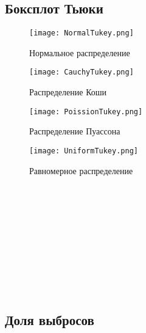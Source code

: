 \documentclass{article}
\begin{document}
\subsection{Боксплот Тьюки}

\begin{figure}[!ht]
\begin{center}
\texttt{[image: NormalTukey.png]}
\caption{Нормальное распределение}\label{figure1}
\end{center}
\end{figure}

\begin{figure}[!ht]
\begin{center}
\texttt{[image: CauchyTukey.png]}
\caption{Распределение Коши}\label{figure2}
\end{center}
\end{figure}

\begin{figure}[!ht]
\begin{center}
\texttt{[image: PoissionTukey.png]}
\caption{Распределение Пуассона}\label{figure4}
\end{center}
\end{figure}

\begin{figure}[!ht]
\begin{center}
\texttt{[image: UniformTukey.png]}
\caption{Равномерное распределение}\label{figure5}
\end{center}
\end{figure}

~\\
~\\
~\\
~\\
~\\
~\\
~\\
~\\
~\\

\subsection{Доля выбросов}
\end{document}
